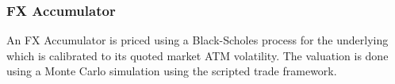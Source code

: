 \subsubsection{FX Accumulator}
\label{pricing:fx_accumulator}

An FX Accumulator is priced using a Black-Scholes process for the underlying which is calibrated to its
quoted market ATM volatility. The valuation is done using a Monte Carlo simulation using the scripted trade framework.


